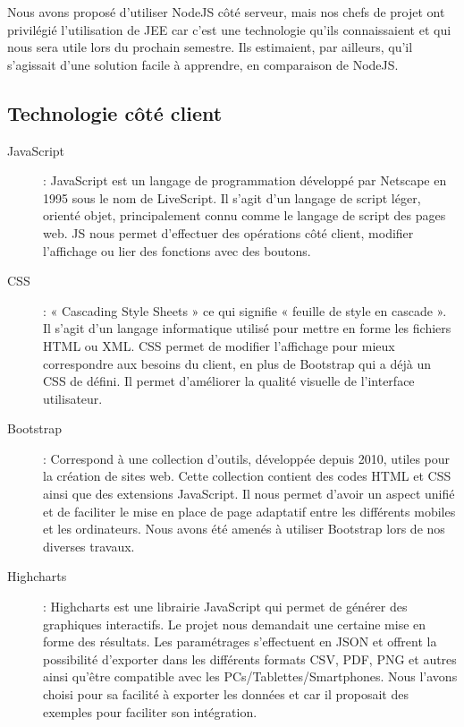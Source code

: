 Nous avons proposé d'utiliser NodeJS côté serveur, mais nos chefs de projet ont privilégié l'utilisation de JEE car c'est une technologie qu'ils connaissaient et qui nous sera utile lors du prochain semestre. Ils estimaient, par ailleurs, qu'il s'agissait d'une solution facile à apprendre, en comparaison de NodeJS. 

\subsection{Technologie côté client}

\begin{description}

\item[JavaScript] : JavaScript est un langage de programmation développé par Netscape en 1995 sous le nom de LiveScript. Il s'agit d'un langage de script léger, orienté objet, principalement connu comme le langage de script des pages web. 
JS nous permet d'effectuer des opérations côté client, modifier l'affichage ou lier des fonctions avec des boutons.\

\item[CSS] : « Cascading Style Sheets » ce qui signifie « feuille de style en cascade ». 
Il s'agit d'un langage informatique utilisé pour mettre en forme les fichiers HTML ou XML. 
CSS permet de modifier l'affichage pour mieux correspondre aux besoins du client, en plus de Bootstrap qui a déjà un CSS de défini. Il permet d'améliorer la qualité visuelle de l'interface utilisateur. \

\item[Bootstrap] : Correspond à une collection d'outils, développée depuis 2010, utiles pour la création de sites web. Cette collection contient des codes HTML et CSS ainsi que des extensions JavaScript. 
Il nous permet d'avoir un aspect unifié et de faciliter le mise en place de page adaptatif entre les différents mobiles et les ordinateurs. Nous avons été amenés à utiliser Bootstrap lors de nos diverses travaux.  \

\item[Highcharts] : Highcharts est une librairie JavaScript qui permet de générer des graphiques interactifs. Le projet nous demandait une certaine mise en forme des résultats. Les paramétrages s'effectuent en JSON et offrent la possibilité d'exporter dans les différents formats CSV, PDF, PNG et autres ainsi qu'être compatible avec les PCs/Tablettes/Smartphones.
Nous l'avons choisi pour sa facilité à exporter les données et car il proposait des exemples pour faciliter son intégration.

\end{description}

